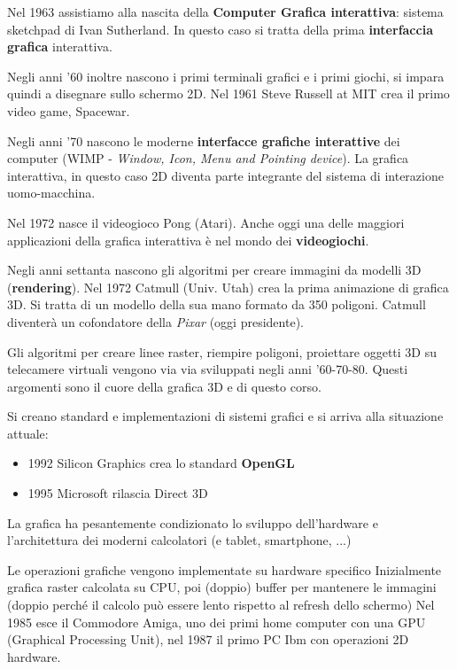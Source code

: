 \documentclass[a4paper, 10pt]{article}
\begin{document}
		\noindent
		Nel 1963 assistiamo alla nascita della \textbf{Computer Grafica interattiva}: sistema sketchpad di Ivan Sutherland. In questo caso si tratta della prima \textbf{interfaccia grafica} interattiva.
		
		\noindent
		Negli anni '60 inoltre nascono i primi terminali grafici e i primi giochi, si impara quindi a disegnare sullo schermo 2D. Nel 1961 Steve Russell at MIT crea il primo video game, Spacewar.
		
		\noindent
		Negli anni '70 nascono le moderne \textbf{interfacce grafiche interattive} dei computer (WIMP - \textit{Window, Icon, Menu and Pointing device}). La grafica interattiva, in questo caso 2D diventa parte integrante del sistema di interazione	uomo-macchina.
		
		\noindent
		Nel 1972 nasce il videogioco Pong (Atari). Anche oggi una delle maggiori applicazioni della	grafica interattiva è nel mondo dei \textbf{videogiochi}.
		
		\noindent
		Negli anni settanta nascono	gli algoritmi per creare immagini da modelli 3D	(\textbf{rendering}).
		Nel 1972 Catmull (Univ. Utah) crea la prima animazione di grafica 3D. Si tratta di un modello della sua mano formato da 350 poligoni. Catmull diventerà un cofondatore della \textit{Pixar} (oggi presidente).
		
		\noindent
		Gli algoritmi per creare linee raster, riempire poligoni, proiettare oggetti 3D su telecamere virtuali vengono via via sviluppati negli anni '60-70-80. Questi argomenti sono il cuore della grafica 3D e di questo corso.
		
		\noindent
		Si creano standard e implementazioni di sistemi grafici e si arriva alla situazione attuale:
		\begin{itemize}
			\item 1992 Silicon Graphics crea lo standard \textbf{OpenGL}
			\item 1995 Microsoft rilascia Direct 3D
		\end{itemize}
		La grafica ha pesantemente condizionato lo sviluppo	dell'hardware e l'architettura dei moderni calcolatori (e tablet, smartphone, ...)
		
		\noindent
		Le operazioni grafiche vengono implementate su hardware	specifico
		Inizialmente grafica raster calcolata su CPU, poi (doppio) buffer per mantenere le immagini (doppio perché il calcolo può essere lento rispetto al refresh dello schermo)
		Nel 1985 esce il Commodore Amiga, uno dei primi home computer con una GPU (Graphical Processing Unit), nel 1987 il primo PC Ibm con operazioni 2D hardware.
		
\end{document}
